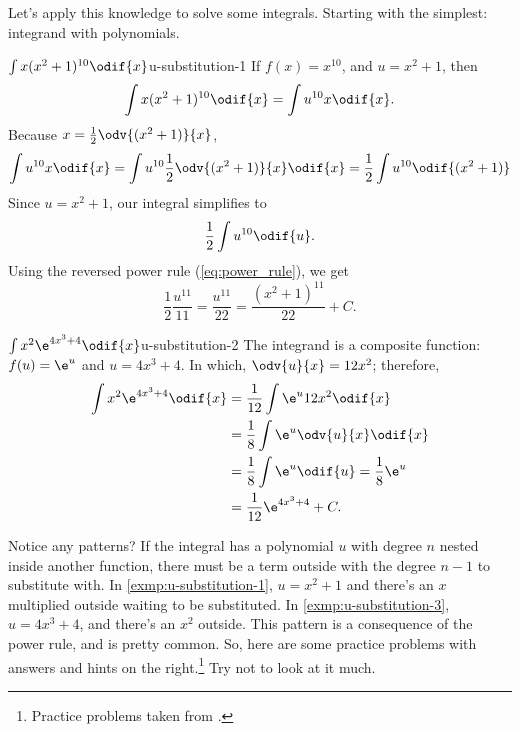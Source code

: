 Let's apply this knowledge to solve some integrals. Starting with the simplest: integrand with polynomials.
\begin{exmp}{$\int x(x^2 + 1)^{10}\odif{x}$}{u-substitution-1}
	If $f(x) = x^{10}$, and $u = x^2 + 1$, then
	\begin{equation}
		\int x(x^2 + 1)^{10}\odif{x} = \int u^{10}x\odif{x}.
	\end{equation}
	Because $x = \frac{1}{2}\odv{(x^2 + 1)}{x}$,
	\begin{equation}
		\int u^{10}x\odif{x} = \int u^{10}\frac{1}{2}\odv{(x^2 + 1)}{x}\odif{x} = \frac{1}{2}\int u^{10}\odif{(x^2 + 1)}
	\end{equation}
	Since $u = x^2 + 1$, our integral simplifies to
	\begin{equation}
		\frac{1}{2}\int u^{10}\odif{u}.
	\end{equation}
	Using the reversed power rule (\cref{eq:power_rule}), we get
	\begin{equation}
		\frac{1}{2}\frac{u^{11}}{11} = \frac{u^{11}}{22} = \frac{(x^2 + 1)^{11}}{22} + C.
	\end{equation}
\end{exmp}

\begin{exmp}{$\int x^2\e^{4x^3 + 4}\odif{x}$}{u-substitution-2}
	The integrand is a composite function: $f(u) = \e^u$ and $u = 4x^3 + 4$. In which, $\odv{u}{x} = 12x^2$; therefore,
	\begin{align}
		\int x^2\e^{4x^3 + 4}\odif{x} & = \frac{1}{12}\int\e^u 12x^2 \odif{x}           \\
		                              & = \frac{1}{8}\int\e^u\odv{u}{x}\odif{x}         \\
		                              & = \frac{1}{8}\int\e^u\odif{u} = \frac{1}{8}\e^u \\
		                              & = \frac{1}{12}\e^{4x^3 + 4} + C.
	\end{align}
\end{exmp}

Notice any patterns? If the integral has a polynomial $u$ with degree $n$ nested inside another function, there must be a term outside with the degree $n - 1$ to substitute with. In \cref{exmp:u-substitution-1}, $u = x^2 + 1$ and there's an $x$ multiplied outside waiting to be substituted. In \cref{exmp:u-substitution-3}, $u = 4x^3 + 4$, and there's an $x^2$ outside. This pattern is a consequence of the power rule, and is pretty common. So, here are some practice problems with answers and hints on the right.\footnote{Practice problems taken from \cite{foster-no-date}.} Try not to look at it much.

